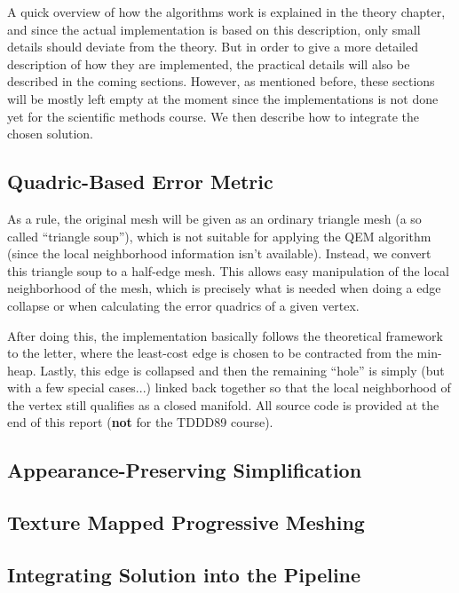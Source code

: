     A quick overview of how the algorithms work is explained in the theory chapter, and since the actual implementation is based on this description, only small details should deviate from the theory. But in order to give a more detailed description of how they are implemented, the practical details will also be described in the coming sections. However, as mentioned before, these sections will be mostly left empty at the moment since the implementations is not done yet for the scientific methods course. We then describe how to integrate the chosen solution.

        \subsection{Quadric-Based Error Metric} \label{sec:quadric-based_error_metric2}

        As a rule, the original mesh will be given as an ordinary triangle mesh (a so called ``triangle soup''), which is not suitable for applying the QEM algorithm (since the local neighborhood information isn't available). Instead, we convert this triangle soup to a half-edge mesh. This allows easy manipulation of the local neighborhood of the mesh, which is precisely what is needed when doing a edge collapse or when calculating the error quadrics of a given vertex.

        After doing this, the implementation basically follows the theoretical framework to the letter, where the least-cost edge is chosen to be contracted from the min-heap. Lastly, this edge is collapsed and then the remaining ``hole'' is simply (but with a few special cases...) linked back together so that the local neighborhood of the vertex still qualifies as a closed manifold. All source code is provided at the end of this report (\textbf{not} for the TDDD89 course).

        \subsection{Appearance-Preserving Simplification} \label{sec:appearance-preserving_simplification2}

        \subsection{Texture Mapped Progressive Meshing} \label{sec:texture_mapped_progressive_meshing2}

        \subsection{Integrating Solution into the Pipeline} \label{sec:integrating_solution_into_the_pipeline}

